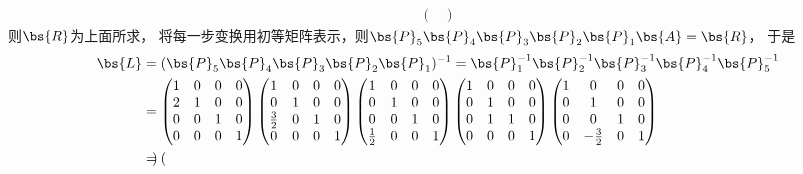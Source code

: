 \documentclass[12pt, a4paper, oneside, UTF8]{ctexbook}
\begin{document}
\begin{solution}
\begin{align*}
\begin{pmatrix}
                \end{pmatrix}
            \end{align*}
            则$\bs{R}$为上面所求，
            将每一步变换用初等矩阵表示，则$\bs{P}_5\bs{P}_4\bs{P}_3\bs{P}_2\bs{P}_1\bs{A}=\bs{R}$，
            于是
            \begin{align*}
                \bs{L}&=(\bs{P}_5\bs{P}_4\bs{P}_3\bs{P}_2\bs{P}_1)^{-1}
                =\bs{P}_1^{-1}\bs{P}_2^{-1}\bs{P}_3^{-1}\bs{P}_4^{-1}\bs{P}_5^{-1}\\
                &=\begin{pmatrix}
                    1& 0 &0 &0\\
                    2&1&0&0\\
                    0&0&1&0\\
                    0&0&0&1
                \end{pmatrix}
                \begin{pmatrix}
                    1& 0 &0 &0\\
                    0&1&0&0\\
                    \frac{3}{2}&0&1&0\\
                    0&0&0&1
                \end{pmatrix}
                \begin{pmatrix}
                    1& 0 &0 &0\\
                    0&1&0&0\\
                    0&0&1&0\\
                    \frac{1}{2}&0&0&1
                \end{pmatrix}
                \begin{pmatrix}
                    1& 0 &0 &0\\
                    0&1&0&0\\
                    0&1&1&0\\
                    0&0&0&1
                \end{pmatrix}
                \begin{pmatrix}
                    1& 0 &0 &0\\
                    0&1&0&0\\
                    0&0&1&0\\
                    0&-\frac{3}{2}&0&1
                \end{pmatrix}\\
                &=\begin{pmatrix}

\end{pmatrix}
\end{align*}
\end{solution}
\end{document}
